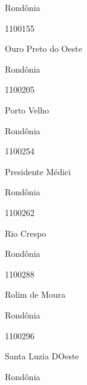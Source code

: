 \documentclass[
  letterpaper,
]{report}
\begin{document}
\n    

\n    

\n      

Rondônia

\n      

1100155

\n      

Ouro Preto do Oeste

\n    

\n    

\n      

Rondônia

\n      

1100205

\n      

Porto Velho

\n    

\n    

\n      

Rondônia

\n      

1100254

\n      

Presidente Médici

\n    

\n    

\n      

Rondônia

\n      

1100262

\n      

Rio Crespo

\n    

\n    

\n      

Rondônia

\n      

1100288

\n      

Rolim de Moura

\n    

\n    

\n      

Rondônia

\n      

1100296

\n      

Santa Luzia D\textquotesingle Oeste

\n    

\n    

\n      

Rondônia
\end{document}
